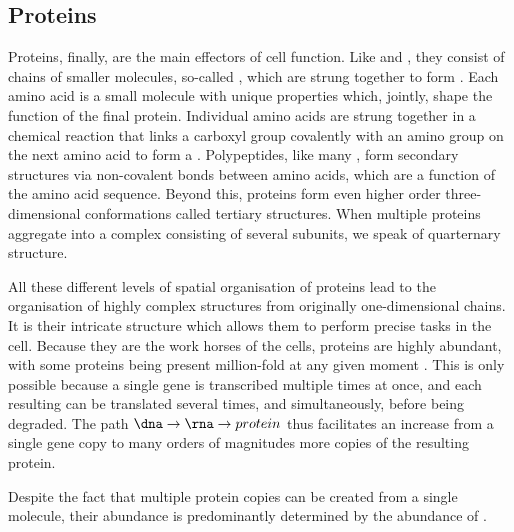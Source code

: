 \subsection{Proteins}

Proteins, finally, are the main effectors of cell function. Like \dna and \rna,
they consist of chains of smaller molecules, so-called
, which are strung together to form
. Each amino acid is a small molecule with unique
properties which, jointly, shape the function of the final protein. Individual
amino acids are strung together in a chemical reaction that links a carboxyl
group covalently with an amino group on the next amino acid to form a
\citep{Alberts:2002}. Polypeptides, like many \rna[s], form secondary structures
via non-covalent bonds between amino acids, which are a function of the amino
acid sequence. Beyond this, proteins form even higher order three-dimensional
conformations called tertiary structures. When multiple proteins aggregate into
a complex consisting of several subunits, we speak of quarternary structure.

All these different levels of spatial organisation of proteins lead to the
organisation of highly complex structures from originally one-dimensional
chains. It is their intricate structure which allows them to perform precise
tasks in the cell. Because they are the work horses of the cells, proteins are
highly abundant, with some proteins being present million-fold at any given
moment \citep{Milo:2013}. This is only possible because a single gene is
transcribed multiple times at once, and each resulting \mrna can be translated
several times, and simultaneously, before being degraded. The path
\(\text{\dna}\rightarrow\text{\rna}\rightarrow protein\) thus facilitates an
increase from a single gene copy to many orders of magnitudes more copies of the
resulting protein.

Despite the fact that multiple protein copies can be created from a single \mrna
molecule, their abundance is predominantly determined by the abundance of
\mrna[s] \citep{Li:2014,Jovanovic:2015,Csardi:2014}.

